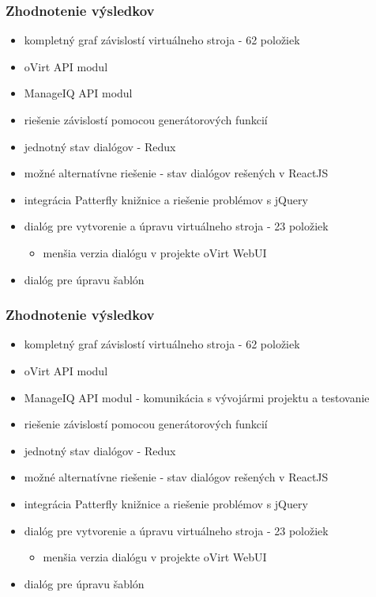 \documentclass[pdf]{beamer}
\begin{document}
\begin{frame}
\frametitle{Zhodnotenie výsledkov}

\begin{itemize}
\item kompletný graf závislostí virtuálneho stroja - 62 položiek
\item oVirt API modul
\item ManageIQ API modul
\item riešenie závislostí pomocou generátorových funkcií
\item jednotný stav dialógov - Redux
\item možné alternatívne riešenie - stav dialógov rešených v ReactJS
\item integrácia Patterfly knižnice a riešenie problémov s jQuery
\item dialóg pre vytvorenie a úpravu virtuálneho stroja - 23 položiek
\begin{itemize}
\item menšia verzia dialógu v projekte oVirt WebUI
\end{itemize}
\item dialóg pre úpravu šablón
\end{itemize}

\end{frame}

\begin{frame}
\frametitle{Zhodnotenie výsledkov}

\begin{itemize}
\item kompletný graf závislostí virtuálneho stroja - 62 položiek
\item oVirt API modul
\item ManageIQ API modul - komunikácia s vývojármi projektu a testovanie
\item riešenie závislostí pomocou generátorových funkcií
\item jednotný stav dialógov - Redux
\item možné alternatívne riešenie - stav dialógov rešených v ReactJS
\item integrácia Patterfly knižnice a riešenie problémov s jQuery
\item dialóg pre vytvorenie a úpravu virtuálneho stroja - 23 položiek
\begin{itemize}
\item menšia verzia dialógu v projekte oVirt WebUI
\end{itemize}
\item dialóg pre úpravu šablón
\end{itemize}

\end{frame}
\end{document}

